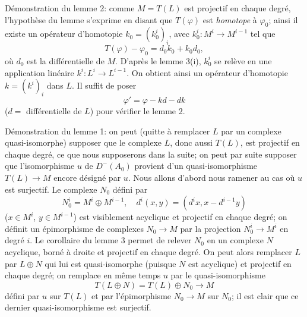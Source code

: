 \documentclass[11pt]{article}
\begin{document}
Démonstration du lemme 2: comme $M=T(L)$ est projectif en chaque degré, l'hypothèse du lemme s'exprime en disant que $T(\varphi)$ est \emph{homotope} à $\varphi_0$; ainsi il existe un opérateur d'homotopie $k_0=(k_0^i)_i$, avec $k_0^i:M^i\to M^{i-1}$ tel que
\[
T(\varphi)-\varphi_0=d_0k_0+k_0d_0,
\]
où $d_0$ est la différentielle de $M$. D'après le lemme 3(i), $k_0^i$ se relève en une application linéaire $k^i:L^i\to L^{i-1}$. On obtient ainsi un opérateur d'homotopie $k=(k^i)_i$ dans $L$. Il suffit de poser
\[
\varphi'=\varphi-kd-dk
\]
($d=$ différentielle de $L$) pour vérifier le lemme 2.

Démonstration du lemme 1: on peut (quitte à remplacer $L$ par un complexe quasi-isomorphe) supposer que le complexe $L$, donc aussi $T(L)$, 
est
projectif en chaque degré, ce que nous supposerons dans la suite; on peut par suite supposer que l'isomorphisme $u$ de $D^-(A_0)$ provient d'un quasi-isomorphisme $T(L)\to M$ encore désigné par $u$. Nous allons d'abord nous ramener au cas où $u$ est surjectif. Le complexe $N_0$ défini par
\[
N_0^i=M^i\oplus M^{i-1},
\quad
 d^i(x,y)=(d^i x,x-d^{i-1}y)
\]
($x\in M^i$, $y\in M^{i-1}$) est visiblement acyclique et projectif en chaque degré; on définit un épimorphisme de complexes $N_0\to M$ par la projection $N_0^i\to M^i$ en degré $i$. Le corollaire du lemme 3 permet de relever $N_0$ en un complexe $N$ acyclique, borné à droite et projectif en chaque degré. On peut alors remplacer $L$ par $L\oplus N$ qui lui est quasi-isomorphe (puisque $N$ est acyclique) et projectif en chaque degré; on remplace en même temps $u$ par le quasi-isomorphisme
\[
T(L\oplus N)=T(L)\oplus N_0\longrightarrow M
\]
défini par $u$ sur $T(L)$ et par l'épimorphisme $N_0\to M$ sur $N_0$; il est clair que ce dernier quasi-isomorphisme est surjectif.
\end{document}
